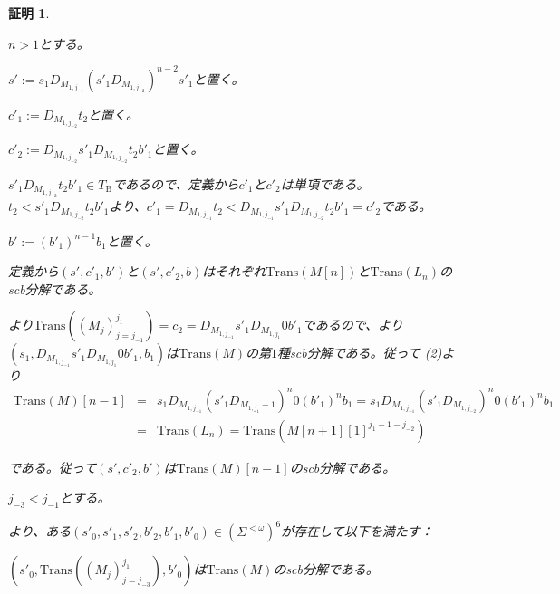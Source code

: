 \documentclass[dvipdfmx,uplatex]{jsarticle}
\theoremstyle{customnonumberbreakfortheorem}
\theoremstyle{customnonumberbreakforproof}
\newtheorem{hideableproof}{証明}
\begin{document}
\begin{hideableproof}
\begin{indented}
\begin{indented}
\begin{indented}
			\end{indented}
			\item \(n > 1\)とする。
			\begin{indented}
				\item \(s' := s_1 D_{M_{1,j_{-1}}} (s'_1 D_{M_{1,j_{-2}}})^{n-2} s'_1\)と置く。
				\item \(c'_1 := D_{M_{1,j_{-2}}} t_2\)と置く。
				\item \(c'_2 := D_{M_{1,j_{-2}}} s'_1 D_{M_{1,j_{-2}}} t_2 b'_1\)と置く。
				\item \(s'_1 D_{M_{1,j_{-2}}} t_2 b'_1 \in T_{\textrm{B}}\)であるので、定義から\(c'_1\)と\(c'_2\)は単項である。\(t_2 < s'_1 D_{M_{1,j_{-2}}} t_2 b'_1\)より、\(c'_1 = D_{M_{1,j_{-1}}} t_2 < D_{M_{1,j_{-1}}} s'_1 D_{M_{1,j_{-2}}} t_2 b'_1 = c'_2\)である。
			\end{indented}
			\item \(b' := (b'_1)^{n-1} b_1\)と置く。
			\item 定義から\((s',c'_1,b')\)と\((s',c'_2,b)\)はそれぞれ\(\textrm{Trans}(M[n])\)と\(\textrm{Trans}(L_n)\)のscb分解である。
			\item {}より\(\textrm{Trans}((M_j)_{j=j_{-1}}^{j_1}) = c_2 = D_{M_{1,j_{-1}}} s'_1 D_{M_{1,j_1}} 0 b'_1\)であるので、より\((s_1,D_{M_{1,j_{-1}}} s'_1 D_{M_{1,j_1}} 0 b'_1,b_1)\)は\(\textrm{Trans}(M)\)の第\(1\)種scb分解である。従って (2)より
			\begin{eqnarray*}
			\textrm{Trans}(M)[n-1] & = & s_1 D_{M_{1,j_{-1}}} (s'_1 D_{M_{1,j_1}-1})^n 0 (b'_1)^n b_1 = s_1 D_{M_{1,j_{-1}}} (s'_1 D_{M_{1,j_{-2}}})^n 0 (b'_1)^n b_1 \\
			& = & \textrm{Trans}(L_n) = \textrm{Trans}(M[n+1][1]^{j_1-1-j_{-2}})
			\end{eqnarray*}
			\item である。従って\((s',c'_2,b')\)は\(\textrm{Trans}(M)[n-1]\)のscb分解である。
		\end{indented}
		\item
		\item \(j_{-3} < j_{-1}\)とする。
		\begin{penumerate}
			\item[] より、ある\((s'_0,s'_1,s'_2,b'_2,b'_1,b'_0) \in (\Sigma^{< \omega})^6\)が存在して以下を満たす：
			\item \((s'_0,\textrm{Trans}((M_j)_{j=j_{-3}}^{j_1}),b'_0)\)は\(\textrm{Trans}(M)\)のscb分解である。

\end{penumerate}
\end{indented}
\end{hideableproof}
\end{document}
